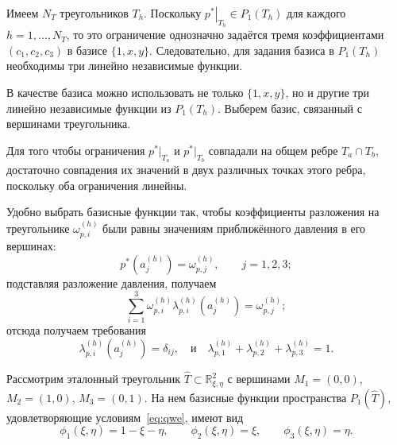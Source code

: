 \documentclass[a4paper,14pt]{extarticle}
\begin{document}
Имеем $N_T$ треугольников $T_h$. Поскольку
$\left.p^*\right|_{T_h}\in P_1(T_h)$ для каждого
$h=1,\ldots,N_T$, то это ограничение однозначно задаётся
тремя коэффициентами $(c_1,c_2,c_3)$ в базисе $\{1,x,y\}$.
Следовательно, для задания базиса в $P_1(T_h)$ необходимы
три линейно независимые функции.

В качестве базиса можно использовать не только $\{1,x,y\}$,
но и другие три линейно независимые функции из $P_1(T_h)$.
Выберем базис, связанный с вершинами треугольника.


Для того чтобы ограничения $p^*|_{T_a}$ и $p^*|_{T_b}$
совпадали на общем ребре $T_a\cap T_b$, достаточно
совпадения их значений в двух различных точках этого ребра,
поскольку оба ограничения линейны.

Удобно выбрать базисные функции так, чтобы коэффициенты
разложения на треугольнике $\omega_{p,i}^{(h)}$ были равны
значениям приближённого давления в его вершинах:
\begin{equation}
	p^*\left(a_j^{(h)}\right)
	=
	\omega_{p,j}^{(h)},
	\qquad j=1,2,3;
\end{equation}
подставляя разложение давления, получаем
\begin{equation}
	\sum_{i=1}^{3}\omega_{p,i}^{(h)}\lambda_{p,i}^{(h)}(a_j^{(h)})
	=\omega_{p,j}^{(h)};
\end{equation}
	отсюда получаем требования
\begin{equation}
		\lambda_{p,i}^{(h)}(a_j^{(h)})=\delta_{ij},\quad \text{и} \quad
		\lambda_{p,1}^{(h)}+	\lambda_{p,2}^{(h)}+	\lambda_{p,3}^{(h)} = 1.
\end{equation}

\begin{tcolorbox}
		Рассмотрим эталонный треугольник
		$\widehat{T}\subset\mathbb{R}^2_{\xi,\eta}$
		с вершинами
		$M_1=(0,0)$, $M_2=(1,0)$, $M_3=(0,1)$.
		На нем базисные функции
		пространства $P_1(\widehat{T})$,
		удовлетворяющие условиям~\eqref{eq:qwe},
		имеют вид
		\begin{equation}
			\phi_1(\xi,\eta)=1-\xi-\eta,\qquad
			\phi_2(\xi,\eta)=\xi,\qquad
			\phi_3(\xi,\eta)=\eta.
		\end{equation}
	\end{tcolorbox}
	
\end{document}
